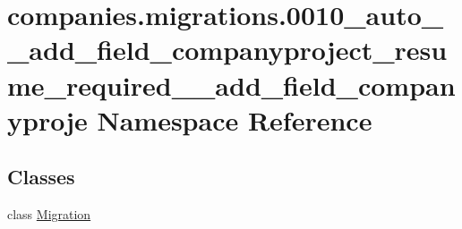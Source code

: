 \hypertarget{namespacecompanies_1_1migrations_1_10010__auto____add__field__companyproject__resume__required____add__field__companyproje}{\section{companies.\-migrations.0010\-\_\-auto\-\_\-\-\_\-add\-\_\-field\-\_\-companyproject\-\_\-resume\-\_\-required\-\_\-\-\_\-add\-\_\-field\-\_\-companyproje Namespace Reference}
\label{namespacecompanies_1_1migrations_1_10010__auto____add__field__companyproject__resume__required____add__field__companyproje}
}
\subsection*{Classes}
\begin{DoxyCompactItemize}
\item 
class \hyperlink{classcompanies_1_1migrations_1_10010__auto____add__field__companyproject__resume__required____ad54079406128046e412e93b8ceaae2c1d}{Migration}
\end{DoxyCompactItemize}
